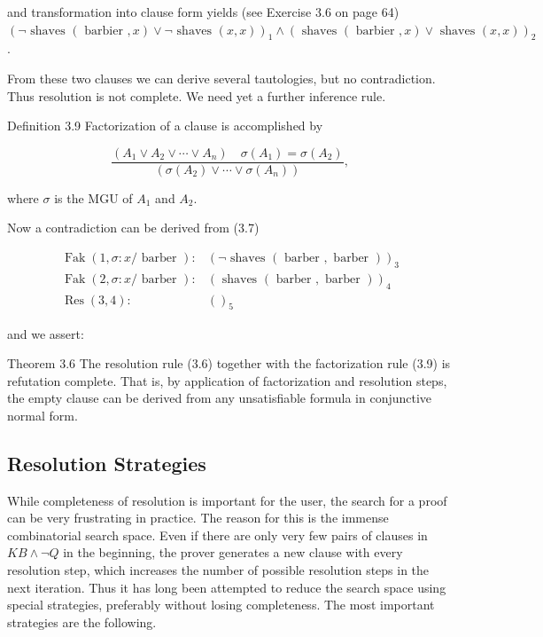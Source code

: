 \documentclass[10pt]{book}
\begin{document}
and transformation into clause form yields (see Exercise 3.6 on page 64)\\
$(\neg \text { shaves }(\text { barbier }, x) \vee \neg \text { shaves }(x, x))_{1} \wedge(\text { shaves }(\text { barbier }, x) \vee \text { shaves }(x, x))_{2}$.

From these two clauses we can derive several tautologies, but no contradiction. Thus resolution is not complete. We need yet a further inference rule.

Definition 3.9 Factorization of a clause is accomplished by

$$
\frac{\left(A_{1} \vee A_{2} \vee \cdots \vee A_{n}\right) \quad \sigma\left(A_{1}\right)=\sigma\left(A_{2}\right)}{\left(\sigma\left(A_{2}\right) \vee \cdots \vee \sigma\left(A_{n}\right)\right)},
$$

where $\sigma$ is the MGU of $A_{1}$ and $A_{2}$.

Now a contradiction can be derived from (3.7)

$$
\begin{aligned}
\operatorname{Fak}(1, \sigma: x / \text { barber }): & (\neg \text { shaves }(\text { barber }, \text { barber }))_{3} \\
\operatorname{Fak}(2, \sigma: x / \text { barber }): & (\text { shaves }(\text { barber }, \text { barber }))_{4} \\
\operatorname{Res}(3,4): & ()_{5}
\end{aligned}
$$

and we assert:

Theorem 3.6 The resolution rule (3.6) together with the factorization rule (3.9) is refutation complete. That is, by application of factorization and resolution steps, the empty clause can be derived from any unsatisfiable formula in conjunctive normal form.

\subsection{Resolution Strategies}
While completeness of resolution is important for the user, the search for a proof can be very frustrating in practice. The reason for this is the immense combinatorial search space. Even if there are only very few pairs of clauses in $K B \wedge \neg Q$ in the beginning, the prover generates a new clause with every resolution step, which increases the number of possible resolution steps in the next iteration. Thus it has long been attempted to reduce the search space using special strategies, preferably without losing completeness. The most important strategies are the following.
\end{document}
